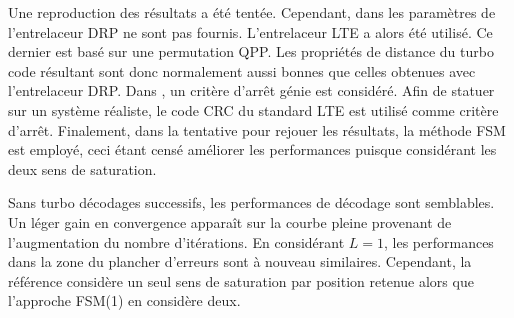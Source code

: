 Une reproduction des résultats a été tentée. Cependant, dans \cite{cim} les paramètres de l'entrelaceur DRP ne sont pas fournis. 
L'entrelaceur LTE a alors été utilisé. Ce dernier est basé sur une permutation QPP. Les propriétés de distance du turbo 
code résultant sont donc normalement aussi bonnes que celles obtenues avec l'entrelaceur DRP. Dans \cite{cim}, un critère 
d'arrêt génie est considéré. Afin de statuer sur un système réaliste, le code CRC du standard LTE est utilisé comme 
critère d'arrêt. 
Finalement, dans la tentative pour rejouer les résultats, la méthode FSM \cite{fsm} est employé, ceci étant censé améliorer les performances puisque considérant les deux sens de saturation.

Sans turbo décodages successifs, les performances de décodage sont semblables. Un léger gain en convergence apparaît 
sur  la courbe pleine provenant de l'augmentation du nombre d'itérations. En considérant $L=1$, les performances dans la
zone du plancher d'erreurs sont à nouveau similaires. Cependant, la référence considère un seul sens de saturation par position
retenue alors que l'approche FSM(1) en considère deux. 


